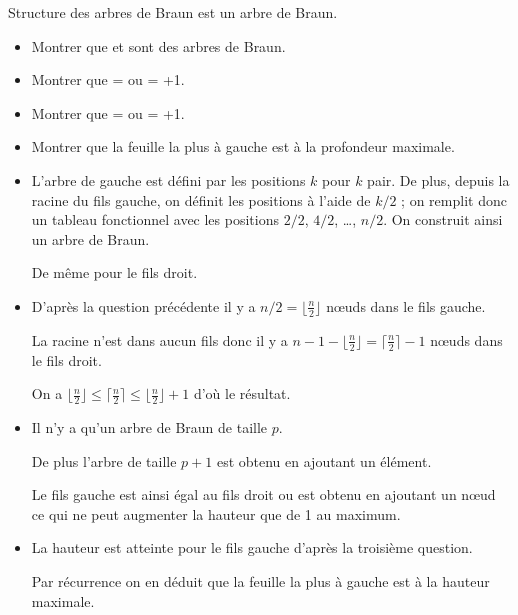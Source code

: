 \begin{exo}{Structure des arbres de Braun}{}
 est un arbre de Braun.
\begin{itemize}
\item Montrer que  et  sont des arbres de Braun.

\item Montrer que  =  ou   =  +1.

\item Montrer que  =   ou  =  +1.

\item Montrer que la feuille la plus à gauche est à la profondeur maximale.
\end{itemize}
\reponse
\begin{itemize}
\item L'arbre de gauche est défini par les positions $k$ pour $k$ pair. De plus, depuis la racine du fils gauche, on définit les positions à l'aide de $k/2$ ; on remplit donc un tableau fonctionnel avec les positions $2/2$, $4/2$, \dots, $n/2$. On construit ainsi un arbre de Braun.

De même pour le fils droit.

\item D'après la question précédente il y a $n/2=\lfloor \frac{n}{2} \rfloor$ nœuds dans le fils gauche.

La racine n'est dans aucun fils donc il y a  $n - 1 - \lfloor \frac{n}{2} \rfloor = \lceil \frac{n}{2} \rceil-1$ nœuds dans le fils droit.

On a $\lfloor \frac{n}{2} \rfloor \le \lceil \frac{n}{2} \rceil \le \lfloor \frac{n}{2} \rfloor + 1$ d'où le résultat.


\item Il n'y a qu'un arbre de Braun de taille $p$.

De plus l'arbre de taille $p+1$ est obtenu en ajoutant un élément.

Le fils gauche est ainsi égal au fils droit ou est obtenu en ajoutant un nœud ce qui ne peut augmenter la hauteur que de 1 au maximum.

\item La hauteur est atteinte pour le fils gauche d'après la troisième question.

Par récurrence on en déduit que la feuille la plus à gauche est à la hauteur maximale.
\end{itemize}
\end{exo}
